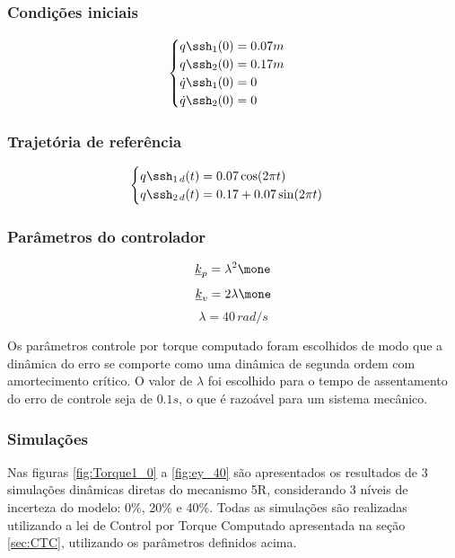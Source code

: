 \documentclass[]{politex}
\begin{document}
\subsubsection{Condições iniciais}
\begin{equation}
\begin{cases}
q\ssh_1(0) = 0.07 m\\
q\ssh_2(0) = 0.17 m \\
\dot{q}\ssh_1(0) = 0 \\
\dot{q}\ssh_2(0) = 0 \\
\end{cases}
\end{equation}

\subsubsection{Trajetória de referência}
\begin{equation}
\begin{cases}
q\ssh_{1 \, d}(t) = 0.07 \cos(2 \pi t) \\
q\ssh_{2 \, d}(t) = 0.17 + 0.07 \sin(2 \pi t) \\
\end{cases}
\end{equation}

\subsubsection{Parâmetros do controlador}
$$ \underline{k}_p = \lambda^2 \mone $$
$$ \underline{k}_v = 2\lambda \mone $$
$$ \lambda = 40 \, rad/s $$

Os parâmetros controle por torque computado foram escolhidos de modo que a dinâmica do erro se comporte como uma dinâmica de segunda ordem com amortecimento crítico. O valor de $\lambda$ foi escolhido para o tempo de assentamento do erro de controle seja de $0.1s$, o que é razoável para um sistema mecânico.

\subsubsection{Simulações}

Nas figuras \ref{fig:Torque1_0} a \ref{fig:ey_40} são apresentados os resultados de 3 simulações dinâmicas diretas do mecanismo 5R, considerando 3 níveis de incerteza do modelo: 0\%, 20\% e 40\%. Todas as simulações são realizadas utilizando a lei de Control por Torque Computado apresentada na seção \ref{sec:CTC}, utilizando os parâmetros definidos acima.
\end{document}
